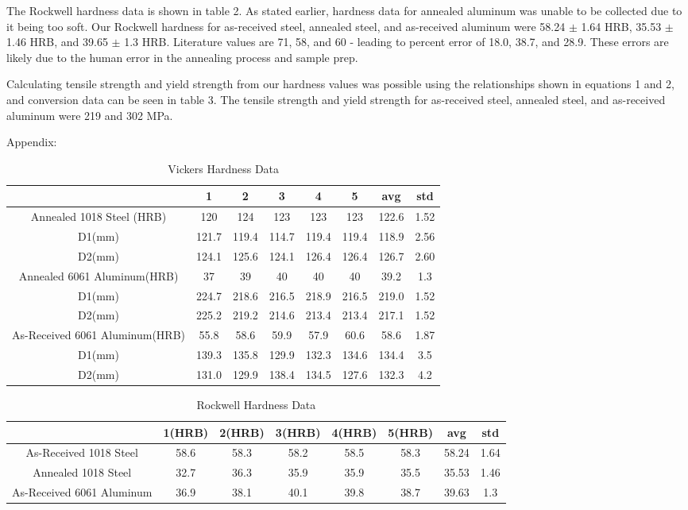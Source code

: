 \documentclass{article}
\begin{document}
The Rockwell hardness data is shown in table 2. As stated earlier, hardness data for annealed aluminum was unable to be collected due to it being too soft. Our Rockwell hardness for as-received steel, annealed steel, and as-received aluminum were 58.24 $\pm$ 1.64 HRB, 35.53 $\pm$ 1.46 HRB, and 39.65 $\pm$ 1.3 HRB. Literature values are 71, 58, and 60 - leading to percent error of 18.0, 38.7, and 28.9. These errors are likely due to the human error in the annealing process and sample prep.

Calculating tensile strength and yield strength from our hardness values was possible using the relationships shown in equations 1 and 2, and conversion data can be seen in table 3. The tensile strength and yield strength for as-received steel, annealed steel, and as-received aluminum were 219 and 302 MPa.
\clearpage

Appendix:\\

\begin{table}[h]
\centering
\caption{Vickers Hardness Data}
\begin{tabular}{||c | c | c | c | c | c | c | c||}
	\hline
	\ 	&
	1	&	2	&	3	&	4	&	5 & avg & std\\
	\hline\hline
	Annealed 1018 Steel	(HRB)	&
	120	&	124	&	123	&	123	&	123 & 122.6 & 1.52\\
	D1(mm)	&
	121.7	& 119.4 & 114.7 & 119.4 & 119.4 & 118.9 & 2.56\\
	D2(mm)	&
	124.1	& 125.6	& 124.1	& 126.4	& 126.4 & 126.7 & 2.60\\
	Annealed 6061 Aluminum(HRB)	&
	37	&	39	&	40	&	40	&	40 & 39.2 & 1.3\\
	D1(mm)	&
	224.7	& 218.6 & 216.5 & 218.9 & 216.5 & 219.0 & 1.52\\
	D2(mm)	&
	225.2	& 219.2 & 214.6 & 213.4 & 213.4 & 217.1 & 1.52\\
	As-Received 6061 Aluminum(HRB)	&
	55.8	&	58.6	&	59.9	&	57.9	&	60.6 & 58.6 & 1.87\\
	D1(mm)	&
	139.3	& 135.8 & 129.9 & 132.3 & 134.6 & 134.4 & 3.5\\
	D2(mm)	&
	131.0	& 129.9 & 138.4 & 134.5 & 127.6 & 132.3 & 4.2\\
	\hline
\end{tabular}
\end{table}

\begin{table}[h]
\centering
\caption{Rockwell Hardness Data}
\begin{tabular}{||c | c | c | c | c | c | c | c||}
	\hline
	\ 	&
	1(HRB) & 2(HRB) & 3(HRB) & 4(HRB) & 5(HRB) & avg & std\\
	\hline\hline
	As-Received 1018 Steel		&
	58.6	&	58.3	&	58.2	&	58.5	&	58.3 & 58.24	& 1.64\\
	Annealed 1018 Steel		&
	32.7	&	36.3	&	35.9	&	35.9	&	35.5 & 35.53 	& 1.46\\
	As-Received 6061 Aluminum	&
	36.9	&	38.1	&	40.1	&	39.8	&	38.7 & 39.63 & 1.3\\
	\hline
\end{tabular}
\end{table}
\end{document}
